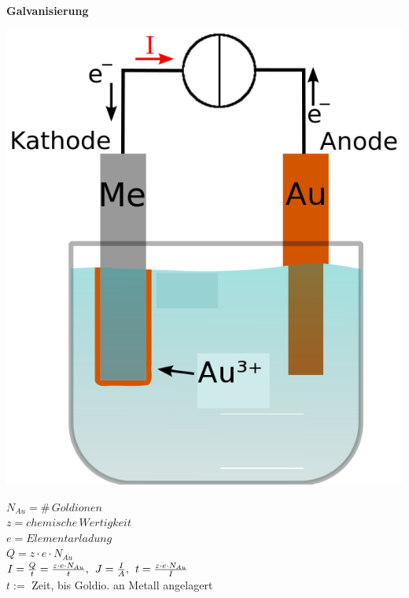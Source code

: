 \documentclass[a4paper, 6pt, landscape]{scrartcl}
\newcommand{\dis}[1]{\hspace{#1cm}}
\begin{document}
\begin{multicols*}{4}
    \textbf{Galvanisierung}\\
      \begin{minipage}[t]{0.24\linewidth}
        \includegraphics[scale=0.07]{source/galvan.png}
      \end{minipage}
      \begin{minipage}[t]{0.76\linewidth}
        \vspace{-1.6cm}
        $N_{Au}=\#\,Goldionen$\\
        $z= chemische\,Wertigkeit$\\
        $e=Elementarladung$\\
        $Q=z\cdot e\cdot N_{Au}$\\
        $I=\frac{Q}{t}=\frac{z\cdot e\cdot N_{Au}}{t},\dis{0.15}J=\frac{I}{A}, \dis{0.15}t=\frac{z\cdot e\cdot N_{Au}}{I}$\\
        $t :=$ Zeit, bis Goldio. an Metall angelagert
      \end{minipage}



\end{multicols*}
\end{document}
